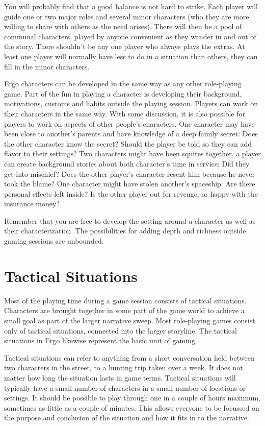 \documentclass[twoside]{book}
\begin{document}
You will probably find that a good balance is not hard to strike. Each
player will guide one or two major roles and several minor characters
(who they are more willing to share with others as the need
arises). There will then be a pool of communal characters, played by
anyone convenient as they wander in and out of the story. There
shouldn't be any one player who always plays the extras. At least one
player will normally have less to do in a situation than others, they
can fill in the minor characters.

Ergo characters can be developed in the same way as any other
role-playing game. Part of the fun in playing a character is
developing their background, motivations, customs and habits outside
the playing session. Players can work on their characters in the same
way. With some discussion, it is also possible for players to work on
aspects of other people's characters. One character may have been
close to another's parents and have knowledge of a deep family secret:
Does the other character know the secret? Should the player be told so
they can add flavor to their settings? Two characters might have been
squires together, a player can create background stories about both
character's time in service: Did they get into mischief? Does the
other player's character resent him because he never took the blame?
One character might have stolen another's spaceship: Are there
personal effects left inside? Is the other player out for revenge, or
happy with the insurance money?

Remember that you are free to develop the setting around a character
as well as their characterization. The possibilities for adding depth
and richness outside gaming sessions are unbounded.

\section{Tactical Situations}

Most of the playing time during a game session consists of tactical
situations. Characters are brought together in some part of the game
world to achieve a small goal as part of the larger narrative
sweep. Most role-playing games consist only of tactical situations,
connected into the larger storyline. The tactical situations in Ergo
likewise represent the basic unit of gaming.

Tactical situations can refer to anything from a short conversation
held between two characters in the street, to a hunting trip taken
over a week. It does not matter how long the situation lasts in game
terms. Tactical situations will typically have a small number of
characters in a small number of locations or settings. It should be
possible to play through one in a couple of hours maximum, sometimes
as little as a couple of minutes. This allows everyone to be focussed
on the purpose and conclusion of the situation and how it fits in to
the narrative.
\end{document}
